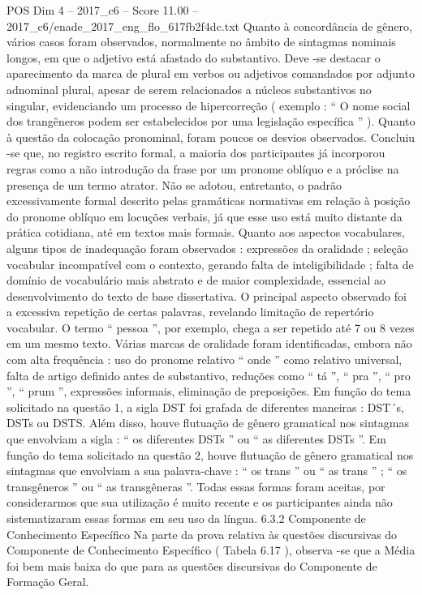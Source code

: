 \begin{textsample}{POS Dim 4 – 2017\_c6 – Score 11.00 – 2017\_c6/enade\_2017\_eng\_flo\_617fb2f4dc.txt}
Quanto à concordância de gênero, vários casos foram observados, normalmente no âmbito de sintagmas nominais longos, em que o adjetivo está afastado do substantivo.
Deve -se destacar o aparecimento da marca de plural em verbos ou adjetivos comandados por adjunto adnominal plural, apesar de serem relacionados a núcleos substantivos no singular, evidenciando um processo de hipercorreção ( exemplo : “ O nome social dos trangêneros podem ser estabelecidos por uma legislação específica ” ).
Quanto à questão da colocação pronominal, foram poucos os desvios observados.
Concluiu -se que, no registro escrito formal, a maioria dos participantes já incorporou regras como a não introdução da frase por um pronome oblíquo e a próclise na presença de um termo atrator.
Não se adotou, entretanto, o padrão excessivamente formal descrito pelas gramáticas normativas em relação à posição do pronome oblíquo em locuções verbais, já que esse uso está muito distante da prática cotidiana, até em textos mais formais.
Quanto aos aspectos vocabulares, alguns tipos de inadequação foram observados : expressões da oralidade ; seleção vocabular incompatível com o contexto, gerando falta de inteligibilidade ; falta de domínio de vocabulário mais abstrato e de maior complexidade, essencial ao desenvolvimento do texto de base dissertativa.
O principal aspecto observado foi a excessiva repetição de certas palavras, revelando limitação de repertório vocabular.
O termo “ pessoa ”, por exemplo, chega a ser repetido até 7 ou 8 vezes em um mesmo texto.
Várias marcas de oralidade foram identificadas, embora não com alta frequência : uso do pronome relativo “ onde ” como relativo universal, falta de artigo definido antes de substantivo, reduções como “ tá ”, “ pra ”, “ pro ”, “ prum ”, expressões informais, eliminação de preposições.
Em função do tema solicitado na questão 1, a sigla DST foi grafada de diferentes maneiras : DST´s, DSTs ou DSTS.
Além disso, houve flutuação de gênero gramatical nos sintagmas que envolviam a sigla : “ os diferentes DSTs ” ou “ as diferentes DSTs ”.
Em função do tema solicitado na questão 2, houve flutuação de gênero gramatical nos sintagmas que envolviam a sua palavra-chave : “ os trans ” ou “ as trans ” ; “ os transgêneros ” ou “ as transgêneras ”.
Todas essas formas foram aceitas, por considerarmos que sua utilização é muito recente e os participantes ainda não sistematizaram essas formas em seu uso da língua. 6.3.2 Componente de Conhecimento Específico Na parte da prova relativa às questões discursivas do Componente de Conhecimento Específico ( Tabela 6.17 ), observa -se que a Média foi bem mais baixa do que para as questões discursivas do Componente de Formação Geral.

\end{textsample}
